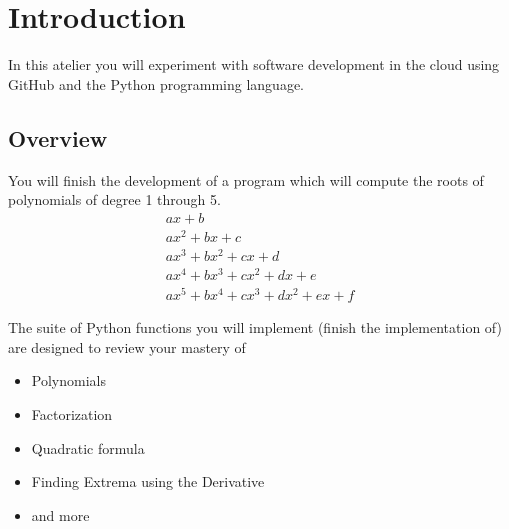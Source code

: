 \section{Introduction}
\label{sec.intro}

In this atelier you will experiment with software development
in the cloud using GitHub and the Python programming language.

\subsection{Overview}

You will finish the development of a program which will compute the
roots of polynomials of degree 1 through 5.
\begin{align*}
  a x + b\\
  a x^2 + b x + c\\
  a x^3 + b x^2 + c x + d\\
  a x^4 + b x^3 + c x^2 + d x + e\\
  a x^5 + b x^4 + c x^3 + d x^2 + e x + f
\end{align*}

The suite of Python functions you will implement (finish the
implementation of) are designed to review your mastery of
\begin{itemize}
\item Polynomials
\item Factorization
\item Quadratic formula
\item Finding Extrema using the Derivative
\item and more
\end{itemize}

